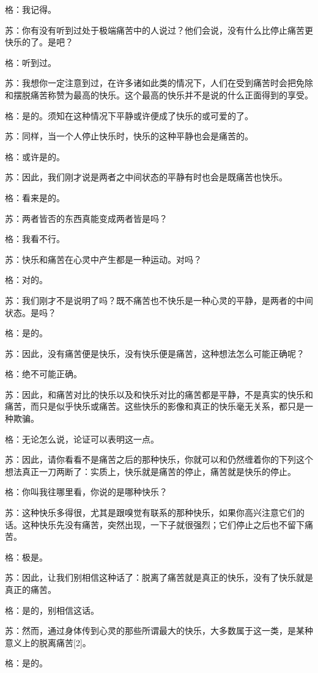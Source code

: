 \documentclass[12pt,oneside]{book}
\begin{document}
格：我记得。

苏：你有没有听到过处于极端痛苦中的人说过？他们会说，没有什么比停止痛苦更快乐的了。是吧？

格：听到过。

苏：我想你一定注意到过，在许多诸如此类的情况下，人们在受到痛苦时会把免除和摆脱痛苦称赞为最高的快乐。这个最高的快乐并不是说的什么正面得到的享受。

格：是的。须知在这种情况下平静或许便成了快乐的或可爱的了。

苏：同样，当一个人停止快乐时，快乐的这种平静也会是痛苦的。

格：或许是的。

苏：因此，我们刚才说是两者之中间状态的平静有时也会是既痛苦也快乐。

格：看来是的。

苏：两者皆否的东西真能变成两者皆是吗？

格：我看不行。

苏：快乐和痛苦在心灵中产生都是一种运动。对吗？

格：对的。

苏：我们刚才不是说明了吗？既不痛苦也不快乐是一种心灵的平静，是两者的中间状态。是吗？

格：是的。

苏：因此，没有痛苦便是快乐，没有快乐便是痛苦，这种想法怎么可能正确呢？

格：绝不可能正确。

苏：因此，和痛苦对比的快乐以及和快乐对比的痛苦都是平静，不是真实的快乐和痛苦，而只是似乎快乐或痛苦。这些快乐的影像和真正的快乐毫无关系，都只是一种欺骗。

格：无论怎么说，论证可以表明这一点。

苏：因此，请你看看不是痛苦之后的那种快乐，你就可以和仍然缠着你的下列这个想法真正一刀两断了：实质上，快乐就是痛苦的停止，痛苦就是快乐的停止。

格：你叫我往哪里看，你说的是哪种快乐？

苏：这种快乐多得很，尤其是跟嗅觉有联系的那种快乐，如果你高兴注意它们的话。这种快乐先没有痛苦，突然出现，一下子就很强烈；它们停止之后也不留下痛苦。

格：极是。

苏：因此，让我们别相信这种话了：脱离了痛苦就是真正的快乐，没有了快乐就是真正的痛苦。

格：是的，别相信这话。

苏：然而，通过身体传到心灵的那些所谓最大的快乐，大多数属于这一类，是某种意义上的脱离痛苦[2]。

格：是的。
\end{document}
